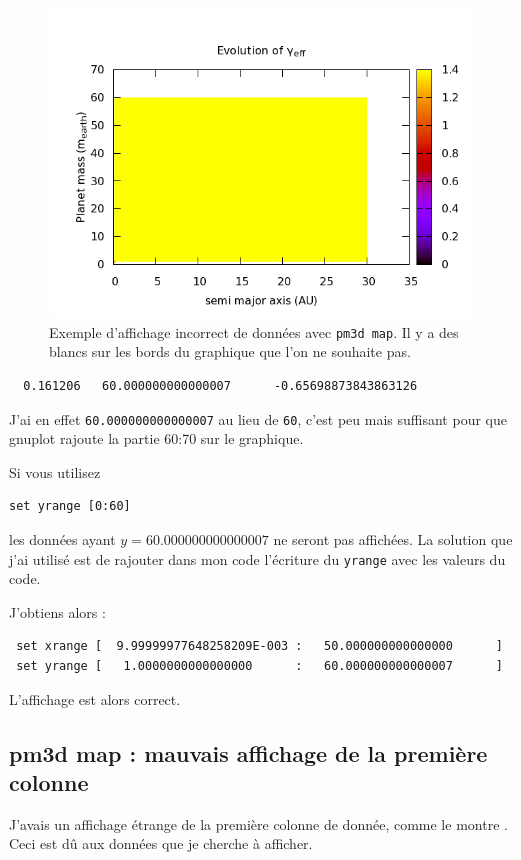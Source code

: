 \documentclass[a4paper,twoside]{article}
\begin{document}
\begin{figure}[htb]
\centering
\includegraphics[width=0.65\linewidth]{figures/pm3d-map_wrong_range.png}
\caption{Exemple d'affichage incorrect de données avec \texttt{pm3d map}. Il y a des blancs sur les bords du graphique que l'on ne souhaite pas.}\label{fig:map_wrong_range}
\end{figure}

\begin{verbatim}
  0.161206   60.000000000000007      -0.65698873843863126     
\end{verbatim}
J'ai en effet \texttt{60.000000000000007} au lieu de \texttt{60}, c'est peu mais suffisant pour que gnuplot rajoute la partie 60:70 sur le graphique. 

Si vous utilisez 
\begin{verbatim}
set yrange [0:60]
\end{verbatim}
les données ayant $y=60.000000000000007$ ne seront pas affichées. La solution que j'ai utilisé est de rajouter dans mon code l'écriture du \texttt{yrange} avec les valeurs du code. 

J'obtiens alors : 
\begin{verbatim}
 set xrange [  9.99999977648258209E-003 :   50.000000000000000      ]
 set yrange [   1.0000000000000000      :   60.000000000000007      ]
\end{verbatim}

L'affichage est alors correct.

\subsection{pm3d map : mauvais affichage de la première colonne}
J'avais un affichage étrange de la première colonne de donnée, comme le montre . Ceci est dû aux données que je cherche à afficher. 
\end{document}
